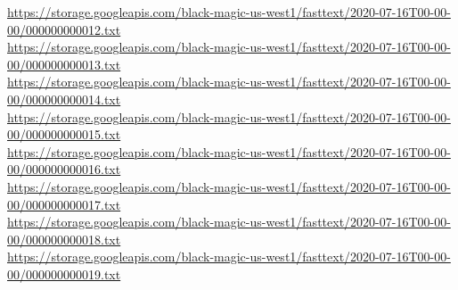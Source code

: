 \begin{apendicesenv}
\url{https://storage.googleapis.com/black-magic-us-west1/fasttext/2020-07-16T00-00-00/000000000012.txt} \\
\url{https://storage.googleapis.com/black-magic-us-west1/fasttext/2020-07-16T00-00-00/000000000013.txt} \\
\url{https://storage.googleapis.com/black-magic-us-west1/fasttext/2020-07-16T00-00-00/000000000014.txt} \\
\url{https://storage.googleapis.com/black-magic-us-west1/fasttext/2020-07-16T00-00-00/000000000015.txt} \\
\url{https://storage.googleapis.com/black-magic-us-west1/fasttext/2020-07-16T00-00-00/000000000016.txt} \\
\url{https://storage.googleapis.com/black-magic-us-west1/fasttext/2020-07-16T00-00-00/000000000017.txt} \\
\url{https://storage.googleapis.com/black-magic-us-west1/fasttext/2020-07-16T00-00-00/000000000018.txt} \\
\url{https://storage.googleapis.com/black-magic-us-west1/fasttext/2020-07-16T00-00-00/000000000019.txt}


\end{apendicesenv}